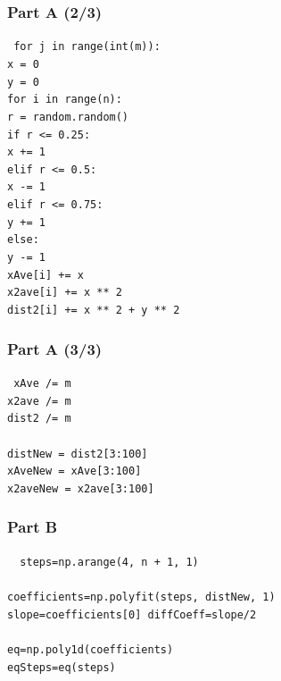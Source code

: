 \documentclass[mathserif,18pt,xcolor=table]{beamer}
\begin{document}
\begin{frame}
	\frametitle{Part A (2/3)}
	{
	\tt
	\qquad for j in range(int(m)):   	\\
    \qquad \qquad x = 0               	\\        
    \qquad \qquad y = 0               	\\    
    \qquad for i in range(n):    	 	\\
    \qquad \qquad r = random.random() 	\\
    \qquad \qquad if r <= 0.25:       	\\
    \qquad \qquad \qquad x += 1     		\\
    \qquad \qquad elif r <= 0.5:		 	\\
    \qquad \qquad \qquad x -= 1			\\
    \qquad \qquad elif r <= 0.75:		\\
    \qquad \qquad \qquad y += 1	 		\\
    \qquad \qquad else:				 	\\
    \qquad \qquad \qquad y -= 1			\\
    \qquad \qquad xAve[i] += x   		\\                         
    \qquad \qquad x2ave[i] += x ** 2    \\
    \qquad \qquad dist2[i] += x ** 2 + y ** 2
	}
\end{frame}

\begin{frame}
	\frametitle{Part A (3/3)}
	{
	\tt
	\qquad xAve /= m  				\\
    \qquad x2ave /= m               	\\        
    \qquad dist2 /= m               	\\
	~\\    
    \qquad distNew = dist2[3:100]   \\                     
	\qquad xAveNew = xAve[3:100]  	\\                      
	\qquad x2aveNew = x2ave[3:100]  \\                
	}	
\end{frame}

\begin{frame}
	\frametitle{Part B}
	\tt
	{
	\qquad steps=np.arange(4, n + 1, 1)    \\               
	~\\
	\qquad coefficients=np.polyfit(steps, distNew, 1)   \\
	\qquad slope=coefficients[0]                     
	\qquad diffCoeff=slope/2                          	\\
  	~\\
	\qquad eq=np.poly1d(coefficients) \\          
	\qquad eqSteps=eq(steps)    \\                
	}
\end{frame}
\end{document}
